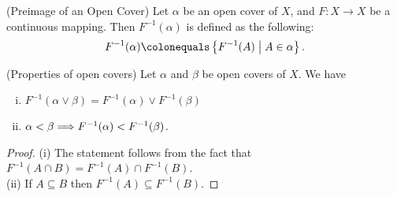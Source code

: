 \documentclass[12pt,twoside,draft]{book}
\begin{document}
\begin{definition}
  (Preimage of an Open Cover)
  Let $\alpha$ be an open cover of $X$, and $F: X \to X$ be a continuous mapping.
  Then $F^{-1}(\alpha)$ is defined as the following:
  \begin{equation*}
    F^{-1}(\alpha) \ceq \setst{F^{-1}(A)}{A \in \alpha}.
  \end{equation*}
\end{definition}
\begin{proposition}
  (Properties of open covers)
  Let $\alpha$ and $\beta$ be open covers of $X$.
  We have
  \begin{enumerate}[(i)]
    \item $F^{-1}(\alpha \vee  \beta) = F^{-1}(\alpha) \vee F^{-1}(\beta)$
    \item $\alpha < \beta \Longrightarrow F^{-1}(\alpha) < F^{-1}(\beta)$.
  \end{enumerate}
  \begin{proof}
    (i) The statement follows from the fact that $F^{-1}(A \cap B) = F^{-1}(A) \cap F^{-1}(B)$. \\
    (ii) If $A \subseteq B$ then $F^{-1}(A) \subseteq F^{-1}(B)$.
  \end{proof}
\end{proposition}
\end{document}

